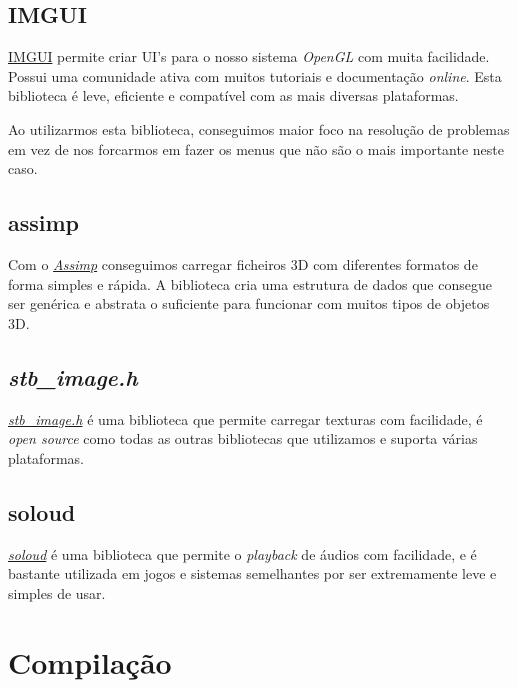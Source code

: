 \subsection{IMGUI}
\label{chap2:sec:imgui}

\noindent
\hyperlink{https://github.com/ocornut/imgui}{\ac{IMGUI}} \cite{imguigithub} permite criar \ac{UI}'s para o nosso sistema \textit{OpenGL} com muita facilidade. Possui uma comunidade ativa com muitos tutoriais e documentação \textit{online}. Esta biblioteca é leve, eficiente e compatível com as mais diversas plataformas.

\noindent
Ao utilizarmos esta biblioteca, conseguimos maior foco na resolução de problemas em vez de nos forcarmos em fazer os menus que não são o mais importante neste caso.

\subsection{assimp}
\label{chap2:sec:assimp}

\noindent
Com o \hyperlink{https://github.com/assimp/assimp}{\textit{Assimp}} \cite{assimpgithub} conseguimos carregar ficheiros 3D com diferentes formatos de forma simples e rápida. A biblioteca cria uma estrutura de dados que consegue ser genérica e abstrata o suficiente para funcionar com muitos tipos de objetos 3D.

\subsection{\textit{stb\_image.h}}
\label{chap2:sec:soil2}

\noindent
\hyperlink{https://github.com/nothings/stb/blob/master/stb\_image.h}{\textit{stb\_image.h}} \cite{stbgithub} é uma biblioteca que permite carregar texturas com facilidade, é \textit{open source} como todas as outras bibliotecas que utilizamos e suporta várias plataformas.

\subsection{soloud}
\label{chap2:sec:soloud}

\noindent
\hyperlink{https://github.com/jarikomppa/soloud}{\textit{soloud}} \cite{soloudgithub} é uma biblioteca que permite o \textit{playback} de áudios com facilidade, e é bastante utilizada em jogos e sistemas semelhantes por ser extremamente leve e simples de usar.

\section{Compilação}
\label{chap2:sec:comp}

